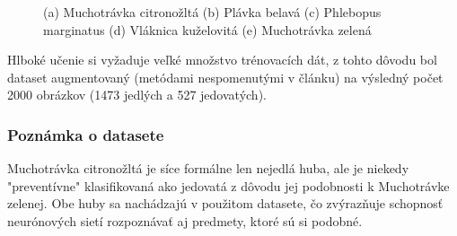 \documentclass[journal,onecolumn]{IEEEtran}
\begin{document}
\begin{figure}[!htb]
    \centering
    \caption{(a) Muchotrávka citronožltá (b) Plávka belavá (c) Phlebopus marginatus (d) Vláknica kuželovitá (e) Muchotrávka zelená}
    \label{fig:foobar}
\end{figure}

\IEEEPARstart{}{}
Hlboké učenie si vyžaduje veľké množstvo trénovacích dát, z tohto dôvodu bol  dataset augmentovaný (metódami nespomenutými v článku) na výsledný počet 2000 obrázkov (1473 jedlých a 527 jedovatých).

\vspace{10pt}
\subsubsection{Poznámka o datasete}
Muchotrávka citronožltá je síce formálne len nejedlá huba, ale je niekedy "preventívne" klasifikovaná ako jedovatá z dôvodu jej podobnosti k Muchotrávke zelenej. Obe huby sa nachádzajú v použitom datasete, čo zvýrazňuje schopnosť neurónových sietí rozpoznávať aj predmety, ktoré sú si podobné. 
\end{document}
